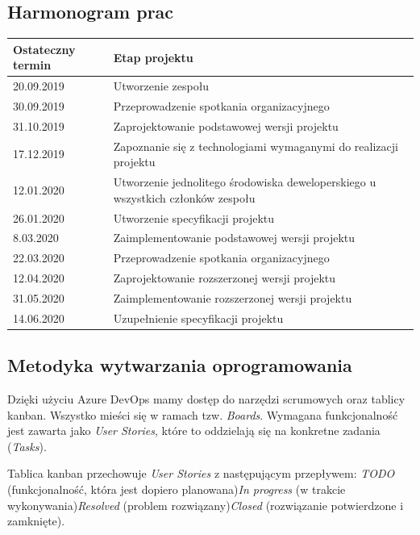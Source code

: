 \documentclass[10pt, titlepage, oneside, a4paper]{article}
\begin{document}
	\subsection{Harmonogram prac}
	\begin{center}
  \begin{tabular}{ | m{3cm} | m{7cm} | } 
  \hline
  Ostateczny termin & Etap projektu \\
  \hline
  20.09.2019 & Utworzenie zespołu \\
	\hline
  30.09.2019 & Przeprowadzenie spotkania organizacyjnego \\  
  \hline
  31.10.2019 & Zaprojektowanie podstawowej wersji projektu \\
  \hline
  17.12.2019 & Zapoznanie się z technologiami wymaganymi do realizacji projektu \\
  \hline
  12.01.2020 & Utworzenie jednolitego środowiska deweloperskiego u wszystkich członków zespołu \\
  \hline
  26.01.2020 & Utworzenie specyfikacji projektu \\
  \hline
  8.03.2020 & Zaimplementowanie podstawowej wersji projektu \\
  \hline
  22.03.2020 & Przeprowadzenie spotkania organizacyjnego \\
  \hline
  12.04.2020 & Zaprojektowanie rozszerzonej wersji projektu \\
  \hline
  31.05.2020 & Zaimplementowanie rozszerzonej wersji projektu \\
  \hline
  14.06.2020 & Uzupełnienie specyfikacji projektu \\
  \hline
  \end{tabular}
  \label{sophisticatedtable}
  \end{center}
 
	\subsection{Metodyka wytwarzania oprogramowania}
	Dzięki użyciu Azure DevOps mamy dostęp do narzędzi scrumowych oraz tablicy kanban. Wszystko mieści się w ramach tzw. \textit{Boards}. Wymagana funkcjonalność jest zawarta jako \textit{User Stories}, które to oddzielają się na konkretne zadania (\textit{Tasks}).
 
	Tablica kanban przechowuje \textit{User Stories} z następującym przepływem: \textit{TODO} (funkcjonalność, która jest dopiero planowana)\textrightarrow \textit{In progress} (w trakcie wykonywania)\textrightarrow \textit{Resolved} (problem rozwiązany)\textrightarrow \textit{Closed} (rozwiązanie potwierdzone i zamknięte).
 
\end{document}
